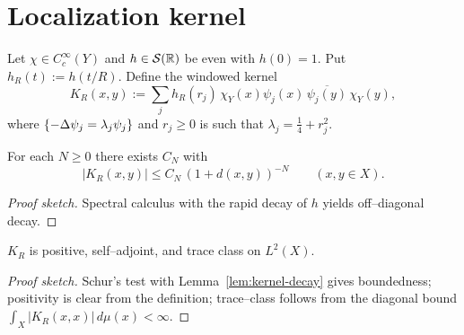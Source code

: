 \section{Localization kernel}\label{sec:kernel}

Let $\chi\in C_c^\infty(Y)$ and $h\in\mathcal{S}(\mathbb{R})$ be even with $h(0)=1$.
Put $h_R(t):=h(t/R)$. Define the windowed kernel
\[
  K_R(x,y) := \sum_j h_R(r_j)\,\chi_Y(x)\psi_j(x)\,\overline{\psi_j(y)}\,\chi_Y(y),
\]
where $\{-\Delta\psi_j=\lambda_j\psi_j\}$ and $r_j\ge 0$ is such that
$\lambda_j=\tfrac14+r_j^2$.

\begin{lemma}\label{lem:kernel-decay}
For each $N\ge 0$ there exists $C_N$ with
\[
  |K_R(x,y)|\le C_N\,(1+d(x,y))^{-N}\qquad (x,y\in X).
\]
\end{lemma}

\begin{proof}[Proof sketch]
Spectral calculus with the rapid decay of $h$ yields off–diagonal decay.
\end{proof}

\begin{lemma}\label{lem:kernel-traceclass}
$K_R$ is positive, self–adjoint, and trace class on $L^2(X)$.
\end{lemma}

\begin{proof}[Proof sketch]
Schur’s test with Lemma~\ref{lem:kernel-decay} gives boundedness; positivity
is clear from the definition; trace–class follows from the diagonal bound
$\int_X |K_R(x,x)|\,d\mu(x)<\infty$.
\end{proof}
